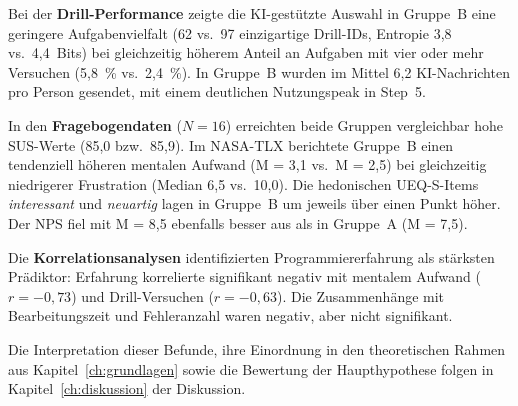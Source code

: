 Bei der \textbf{Drill-Performance} zeigte die KI-gestützte Auswahl in Gruppe~B eine geringere Aufgabenvielfalt (62 vs.\ 97 einzigartige Drill-IDs, Entropie 3{,}8 vs.\ 4{,}4~Bits) bei gleichzeitig höherem Anteil an Aufgaben mit vier oder mehr Versuchen (5{,}8~\% vs.\ 2{,}4~\%). In Gruppe~B wurden im Mittel 6{,}2 KI-Nachrichten pro Person gesendet, mit einem deutlichen Nutzungspeak in Step~5.

In den \textbf{Fragebogendaten} (\(N = 16\)) erreichten beide Gruppen vergleichbar hohe SUS-Werte (85{,}0 bzw.\ 85{,}9). Im NASA-TLX berichtete Gruppe~B einen tendenziell höheren mentalen Aufwand (M = 3{,}1 vs.\ M = 2{,}5) bei gleichzeitig niedrigerer Frustration (Median 6{,}5 vs.\ 10{,}0). Die hedonischen UEQ-S-Items \textit{interessant} und \textit{neuartig} lagen in Gruppe~B um jeweils über einen Punkt höher. Der NPS fiel mit M = 8{,}5 ebenfalls besser aus als in Gruppe~A (M = 7{,}5).

Die \textbf{Korrelationsanalysen} identifizierten Programmiererfahrung als stärksten Prädiktor: Erfahrung korrelierte signifikant negativ mit mentalem Aufwand (\(r = -0{,}73\)) und Drill-Versuchen (\(r = -0{,}63\)). Die Zusammenhänge mit Bearbeitungszeit und Fehleranzahl waren negativ, aber nicht signifikant.

Die Interpretation dieser Befunde, ihre Einordnung in den theoretischen Rahmen aus Kapitel~\ref{ch:grundlagen} sowie die Bewertung der Haupthypothese folgen in Kapitel~\ref{ch:diskussion} der Diskussion.


